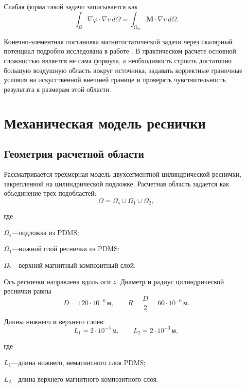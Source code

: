 \documentclass[14pt,a4paper]{extarticle}
\newif\ifwherefirst
\newcommand{\whereitem}[2]{%
    \ifwherefirst
        \wherefirstfalse
        #1\hspace{0.25em}---\hspace{0.25em}#2\par
    \else
        \noindent\hspace*{\parindent}\hphantom{где\enspace}#1\hspace{0.25em}---\hspace{0.25em}#2\par
    \fi
}
\newenvironment{whereblock}{%
    \vspace*{-1.55\baselineskip}%
    \begingroup
    \singlespacing
    \wherefirsttrue
    \par\indent где\enspace\ignorespaces
}{%
    \par\endgroup
    \par\vspace{\baselineskip}
}
\newcommand{\numberedsection}[1]{%
    \clearpage
    \section{#1}%
}
\begin{document}
Слабая форма такой задачи записывается как
\begin{equation}
    \int_{\Omega}
    \nabla\varphi\cdot\nabla v\,d\Omega
    =
    \int_{\Omega_m}
    \mathbf{M}\cdot\nabla v\,d\Omega.
\end{equation}

Конечно-элементная постановка магнитостатической задачи через скалярный потенциал подробно исследована в работе \cite{bermudez2008}. В практическом расчете основной сложностью является не сама формула, а необходимость строить достаточно большую воздушную область вокруг источника, задавать корректные граничные условия на искусственной внешней границе и проверять чувствительность результата к размерам этой области.



\numberedsection{Механическая модель реснички}

\subsection{Геометрия расчетной области}

Рассматривается трехмерная модель двухсегментной цилиндрической реснички, закрепленной на цилиндрической подложке. Расчетная область задается как объединение трех подобластей:
\begin{equation}
    \Omega =
    \Omega_s \cup \Omega_1 \cup \Omega_2,
\end{equation}
\begin{whereblock}
\whereitem{\(\Omega_s\)}{подложка из PDMS;}
\whereitem{\(\Omega_1\)}{нижний слой реснички из PDMS;}
\whereitem{\(\Omega_2\)}{верхний магнитный композитный слой.}
\end{whereblock}

Ось реснички направлена вдоль оси \(z\). Диаметр и радиус цилиндрической реснички равны
\begin{equation}
    D=120\cdot10^{-6}\,\text{м},
    \qquad
    R=\frac{D}{2}=60\cdot10^{-6}\,\text{м}.
\end{equation}

Длины нижнего и верхнего слоев:
\begin{equation}
    L_1=2\cdot10^{-3}\,\text{м},
    \qquad
    L_2=2\cdot10^{-3}\,\text{м},
\end{equation}
\begin{whereblock}
\whereitem{\(L_1\)}{длина нижнего, немагнитного слоя PDMS;}
\whereitem{\(L_2\)}{длина верхнего магнитного композитного слоя.}
\end{whereblock}
\end{document}
